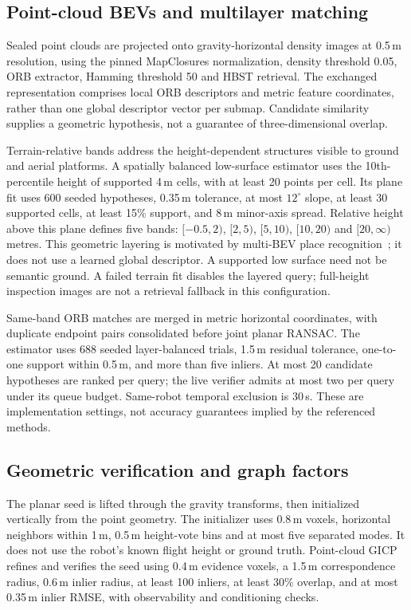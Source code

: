 \subsection{Point-cloud BEVs and multilayer matching}
Sealed point clouds are projected onto gravity-horizontal density images at 0.5\,m resolution, using the pinned MapClosures normalization, density threshold 0.05, ORB extractor, Hamming threshold 50 and HBST retrieval. The exchanged representation comprises local ORB descriptors and metric feature coordinates, rather than one global descriptor vector per submap. Candidate similarity supplies a geometric hypothesis, not a guarantee of three-dimensional overlap.

Terrain-relative bands address the height-dependent structures visible to ground and aerial platforms. A spatially balanced low-surface estimator uses the 10th-percentile height of supported 4\,m cells, with at least 20 points per cell. Its plane fit uses 600 seeded hypotheses, 0.35\,m tolerance, at most $12^\circ$ slope, at least 30 supported cells, at least 15\% support, and 8\,m minor-axis spread. Relative height above this plane defines five bands: $[-0.5,2)$, $[2,5)$, $[5,10)$, $[10,20)$ and $[20,\infty)$ metres. This geometric layering is motivated by multi-BEV place recognition~\cite{forestlpr}; it does not use a learned global descriptor. A supported low surface need not be semantic ground. A failed terrain fit disables the layered query; full-height inspection images are not a retrieval fallback in this configuration.

Same-band ORB matches are merged in metric horizontal coordinates, with duplicate endpoint pairs consolidated before joint planar RANSAC. The estimator uses 688 seeded layer-balanced trials, 1.5\,m residual tolerance, one-to-one support within 0.5\,m, and more than five inliers. At most 20 candidate hypotheses are ranked per query; the live verifier admits at most two per query under its queue budget. Same-robot temporal exclusion is 30\,s. These are implementation settings, not accuracy guarantees implied by the referenced methods.

\subsection{Geometric verification and graph factors}
The planar seed is lifted through the gravity transforms, then initialized vertically from the point geometry. The initializer uses 0.8\,m voxels, horizontal neighbors within 1\,m, 0.5\,m height-vote bins and at most five separated modes. It does not use the robot's known flight height or ground truth. Point-cloud GICP~\cite{gicp,smallgicp} refines and verifies the seed using 0.4\,m evidence voxels, a 1.5\,m correspondence radius, 0.6\,m inlier radius, at least 100 inliers, at least 30\% overlap, and at most 0.35\,m inlier RMSE, with observability and conditioning checks.


